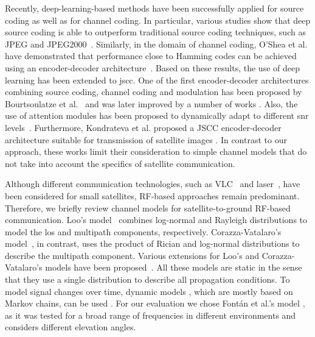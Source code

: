 \documentclass[conference]{IEEEtran}
\begin{document}
Recently, deep-learning-based methods have been successfully applied for source coding as well as for channel coding. In particular, various studies show that deep source coding is able to outperform traditional source coding techniques, such as JPEG and JPEG2000~\cite{toderici2016variable, ballé2017endtoend, Hu2022}.
Similarly, in the domain of channel coding, O'Shea et al. have demonstrated that performance close to Hamming codes can be achieved using an encoder-decoder architecture~\cite{8054694}. 
Based on these results, the use of deep learning has been extended to \ac{jscc}.
One of the first encoder-decoder architectures combining source coding, channel coding and modulation has been proposed by Bourtsoulatze et al.~\cite{Bourtsoulatze2019} and was later improved by a number of works \cite{Xuan2021,Kurka2021,yang2021_2}.
Also, the use of attention modules has been proposed to dynamically adapt to different \ac{snr} levels~\cite{9438648}. 
Furthermore, Kondrateva et al. proposed a JSCC encoder-decoder architecture suitable for transmission of satellite images \cite{satjscc}.
In contrast to our approach, these works limit their consideration to simple channel models that do not take into account the specifics of satellite communication.

Although different communication technologies, such as VLC~\cite{nakajima2012} and laser~\cite{welle2018}, have been considered for small satellites, RF-based approaches remain predominant.
Therefore, we briefly review channel models for satellite-to-ground RF-based communication.   
Loo's model~\cite{1623307} combines log-normal and Rayleigh distributions to model the \ac{los} and multipath components, respectively.
Corazza-Vatalaro's model~\cite{Corazza1994ASM}, in contrast, uses the product of Rician and log-normal distributions to describe the multipath component. 
Various extensions for Loo's and Corazza-Vatalaro's models have been proposed~\cite{596315, 661055}.
All these models are static in the sense that they use a single distribution to describe all propagation conditions.
To model signal changes over time, dynamic models \cite{966585,4151152,7779114,8693582}, which are mostly based on Markov chains, can be used \cite{9079470}.
For our evaluation we chose Fontán et al.'s model \cite{966585}, as it was tested for a broad range of frequencies in different environments and considers different elevation angles.
\end{document}
